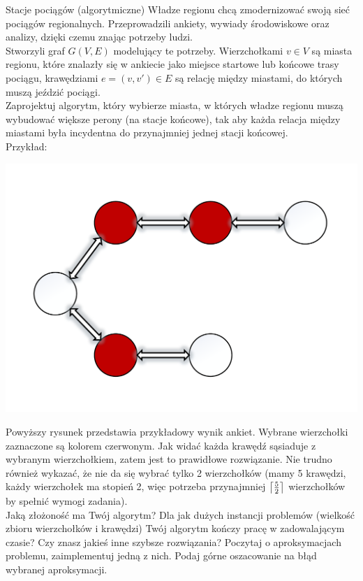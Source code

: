 \begin{exercise}{Stacje pociągów (algorytmiczne)}{}
Władze regionu chcą zmodernizować swoją sieć pociągów regionalnych. Przeprowadzili ankiety, wywiady środowiskowe oraz analizy, dzięki czemu znając potrzeby ludzi. \\

Stworzyli graf $G(V, E)$ modelujący te potrzeby. Wierzchołkami $v \in V$ są miasta regionu, które znalazły się w ankiecie jako miejsce startowe lub końcowe trasy pociągu, krawędziami $e=(v,v') \in E$ są relację między miastami, do których muszą jeździć pociągi. \\

Zaprojektuj algorytm, który wybierze miasta, w których władze regionu muszą wybudować większe perony (na stacje końcowe), tak aby każda relacja między miastami była incydentna do przynajmniej jednej stacji końcowej. \\
Przykład:

\begin{center}
\includegraphics[scale=0.3]{Rysunki/zad19.pdf}
\end{center}

Powyższy rysunek przedstawia przykładowy wynik ankiet. Wybrane wierzchołki zaznaczone są kolorem czerwonym. Jak widać każda krawędź sąsiaduje z wybranym wierzchołkiem, zatem jest to prawidłowe rozwiązanie. Nie trudno również wykazać, że nie da się wybrać tylko 2 wierzchołków (mamy 5 krawędzi, każdy wierzchołek ma stopień 2, więc potrzeba przynajmniej $\ceil*{\frac{5}{2}}$  wierzchołków by spełnić wymogi zadania). \\

Jaką złożoność ma Twój algorytm? Dla jak dużych instancji problemów (wielkość zbioru wierzchołków i krawędzi) Twój algorytm kończy pracę w zadowalającym czasie? Czy znasz jakieś inne szybsze rozwiązania? Poczytaj o aproksymacjach problemu, zaimplementuj jedną z nich. Podaj górne oszacowanie na błąd wybranej aproksymacji.
\end{exercise}


